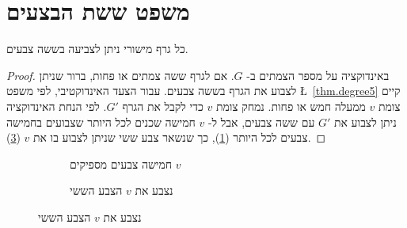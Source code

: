 \section{משפט ששת הבצעים}\label{s.six-color}

\begin{theorem}\label{thm.sixcolor}
כל גרף מישורי ניתן לצביעה בששה צבעים.
\end{theorem}

\begin{proof}
באינדוקציה על מספר הצמתים ב-%
$G$.
אם לגרף ששה צמתים או פחות, ברור שניתן לצבוע את הגרף בששה צבעים. עבור הצעד האינדוקטיבי, לפי משפט
\L{~\ref{thm.degree5}}
קיים צומת
$v$
ממעלה חמש או פחות. נמחק צומת
$v$
כדי לקבל את הגרף
$G'$.
לפי הנחת האינדוקציה ניתן לצבוע את
$G'$
עם ששה צבעים, אבל ל-%
$v$
חמישה שכנים לכל היותר שצבועים בחמישה צבעים לכל היותר
(\ref{f.five-six-five}),
כך שנשאר צבע ששי שניתן לצבוע בו את
$v$
(\ref{f.five-six-six}).
\end{proof}

\begin{figure}[tb]
\begin{center}
\begin{subfigure}{.4\textwidth}
\caption{חמישה צבעים מספיקים
$v$}\label{f.five-six-five}
\end{subfigure}
\hspace{3em}
\begin{subfigure}{.4\textwidth}
\caption{נצבע את
$v$
הצבע הששי}
\label{f.five-six-six}
\end{subfigure}
\end{center}
\end{figure}

